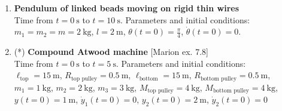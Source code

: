 \documentclass[11pt, a4paper, twoside]{article}
\begin{document}
\begin{enumerate}
\item 
	\begin{minipage}[t][2cm]{0.7\textwidth}
	\textbf{Pendulum of linked beads moving on rigid thin wires}\\
	Time from \(t = \SI{0}{\second}\) to \(t = \SI{10}{\second}\). Parameters and initial conditions:\\
	\(m_1 = m_2 = m = \SI{2}{\kilo\gram}\), \(l = \SI{2}{\metre}\), \(\theta(t=0) = \frac{\pi}{4}\), \(\dot{\theta}(t=0) = 0\).
	\end{minipage}
	\begin{minipage}[c][2cm][t]{0.3\textwidth}
		\hspace{0.5cm}
				
	\end{minipage}

	\newpage

\item
\begin{minipage}[t][2cm]{0.65\textwidth}
(*) \textbf{Compound Atwood machine} [Marion ex. 7.8]\\
	Time from \(t = \SI{0}{\second}\) to \(t = \SI{5}{\second}\). Parameters and initial conditions:\\
\(\ell_\text{top} = \SI{15}{\metre}\), 
\(R_{\text{top pulley}} = \SI{0.5}{\metre}\), 
\(\ell_\text{bottom} = \SI{15}{\metre}\), 
\(R_{\text{bottom pulley}} = \SI{0.5}{\metre}\),\\ 
\(m_1 = \SI{1}{\kilo\gram}\),
\(m_2 = \SI{2}{\kilo\gram}\),
\(m_3 = \SI{3}{\kilo\gram}\),
\(M_{\text{top pulley}} = \SI{4}{\kilo\gram}\),
\(M_{\text{bottom pulley}} = \SI{4}{\kilo\gram}\),\\
\(y(t=0) = \SI{1}{\metre}\), \(\dot{y}_1(t=0) = 0\),
\(y_2(t=0) = \SI{2}{\metre}\), \(\dot{y}_2(t=0) = 0\)
\end{minipage}
\begin{minipage}[c][3cm][t]{0.3\textwidth}
		
\end{minipage}

\end{enumerate}
\end{document}
